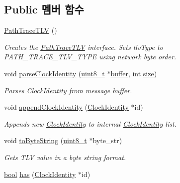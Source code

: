 \subsection*{Public 멤버 함수}
\begin{DoxyCompactItemize}
\item 
\hyperlink{class_path_trace_t_l_v_a0adbcddeb63725561c28a9ad365b7913}{Path\+Trace\+T\+LV} ()
\begin{DoxyCompactList}\small\item\em Creates the \hyperlink{class_path_trace_t_l_v}{Path\+Trace\+T\+LV} interface. Sets tlv\+Type to P\+A\+T\+H\+\_\+\+T\+R\+A\+C\+E\+\_\+\+T\+L\+V\+\_\+\+T\+Y\+PE using network byte order. \end{DoxyCompactList}\item 
void \hyperlink{class_path_trace_t_l_v_a66b71b1178893f98ba403e961e8fb6cf}{parse\+Clock\+Identity} (\hyperlink{stdint_8h_aba7bc1797add20fe3efdf37ced1182c5}{uint8\+\_\+t} $\ast$\hyperlink{_hello_test_8cpp_a8be6d469a7cd1c8d66cc6d2d1e10c65b}{buffer}, int \hyperlink{gst__avb__playbin_8c_a439227feff9d7f55384e8780cfc2eb82}{size})
\begin{DoxyCompactList}\small\item\em Parses \hyperlink{class_clock_identity}{Clock\+Identity} from message buffer. \end{DoxyCompactList}\item 
void \hyperlink{class_path_trace_t_l_v_ae55bd9f3f09977efe12e811e03741e9a}{append\+Clock\+Identity} (\hyperlink{class_clock_identity}{Clock\+Identity} $\ast$id)
\begin{DoxyCompactList}\small\item\em Appends new \hyperlink{class_clock_identity}{Clock\+Identity} to internal \hyperlink{class_clock_identity}{Clock\+Identity} list. \end{DoxyCompactList}\item 
void \hyperlink{class_path_trace_t_l_v_acd2477c3b4df4f055d57ceae73e545a0}{to\+Byte\+String} (\hyperlink{stdint_8h_aba7bc1797add20fe3efdf37ced1182c5}{uint8\+\_\+t} $\ast$byte\+\_\+str)
\begin{DoxyCompactList}\small\item\em Gets T\+LV value in a byte string format. \end{DoxyCompactList}\item 
\hyperlink{avb__gptp_8h_af6a258d8f3ee5206d682d799316314b1}{bool} \hyperlink{class_path_trace_t_l_v_ade002bca1042a2d70d682b0cf69e8717}{has} (\hyperlink{class_clock_identity}{Clock\+Identity} $\ast$id)

\end{DoxyCompactItemize}
